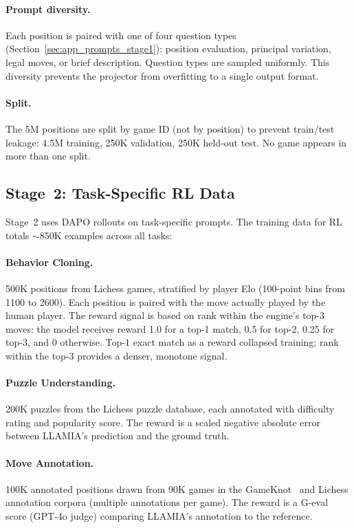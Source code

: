 \paragraph{Prompt diversity.} Each position is paired with one of four question types (Section~\ref{sec:app_prompts_stage1}): position evaluation, principal variation, legal moves, or brief description. Question types are sampled uniformly. This diversity prevents the projector from overfitting to a single output format.

\paragraph{Split.} The 5M positions are split by game ID (not by position) to prevent train/test leakage: 4.5M training, 250K validation, 250K held-out test. No game appears in more than one split.

\subsection{Stage~2: Task-Specific RL Data}
\label{sec:app_data_stage2}

Stage~2 uses DAPO rollouts on task-specific prompts. The training data for RL totals ${\sim}$850K examples across all tasks:

\paragraph{Behavior Cloning.} 500K positions from Lichess games, stratified by player Elo (100-point bins from 1100 to 2600). Each position is paired with the move actually played by the human player. The reward signal is based on rank within the engine's top-3 moves: the model receives reward 1.0 for a top-1 match, 0.5 for top-2, 0.25 for top-3, and 0 otherwise. Top-1 exact match as a reward collapsed training; rank within the top-3 provides a denser, monotone signal.

\paragraph{Puzzle Understanding.} 200K puzzles from the Lichess puzzle database, each annotated with difficulty rating and popularity score. The reward is a scaled negative absolute error between LLAMIA's prediction and the ground truth.

\paragraph{Move Annotation.} 100K annotated positions drawn from 90K games in the GameKnot~\cite{Gameknot} and Lichess annotation corpora (multiple annotations per game). The reward is a G-eval score (GPT-4o judge) comparing LLAMIA's annotation to the reference.

